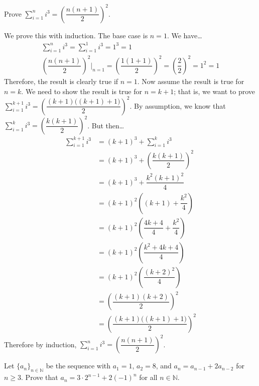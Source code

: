 \documentclass[11pt,letterpaper]{article}
\begin{document}

 Prove $\displaystyle \sum_{i=1}^n i^3= \left( \dfrac{n(n + 1)}{2} \right)^2$. \pspace

\sol We prove this with induction. The base case is $n= 1$. We have\dots
	\[
	\begin{gathered}
	\sum_{i=1}^n i^3= \sum_{i=1}^1 i^3= 1^3= 1 \\[0.3cm]
	\left( \dfrac{n(n + 1)}{2} \right)^2 \bigg|_{n=1}= \left( \dfrac{1(1 + 1)}{2} \right)^2= \left( \dfrac{2}{2} \right)^2= 1^2= 1
	\end{gathered}
	\]
Therefore, the result is clearly true if $n= 1$. Now assume the result is true for $n= k$. We need to show the result is true for $n= k + 1$; that is, we want to prove $\displaystyle \sum_{i=1}^{k+1} i^3= \left( \dfrac{(k + 1) \big( (k + 1) + 1 \big)}{2} \right)^2$. By assumption, we know that $\displaystyle \sum_{i=1}^k i^3= \left( \dfrac{k(k + 1)}{2} \right)^2$. But then\dots
	\[
	\begin{aligned}
	\sum_{i=1}^{k+1} i^3&= (k + 1)^3 + \sum_{i=1}^k i^3 \\
	&= (k + 1)^3 + \left( \dfrac{k(k + 1)}{2} \right)^2 \\
	&= (k + 1)^3 + \dfrac{k^2 (k + 1)^2}{4} \\
	&= (k + 1)^2 \left( (k + 1) + \dfrac{k^2}{4} \right) \\
	&= (k + 1)^2 \left( \dfrac{4k + 4}{4} + \dfrac{k^2}{4} \right) \\
	&= (k + 1)^2 \left( \dfrac{k^2 + 4k + 4}{4} \right) \\
	&= (k + 1)^2 \left( \dfrac{(k + 2)^2}{4} \right) \\
	&= \left( \dfrac{(k + 1)(k + 2)}{2} \right)^2 \\
	&= \left( \dfrac{(k + 1) \big( (k + 1) + 1 \big)}{2} \right)^2 
	\end{aligned}
	\]
Therefore by induction, $\displaystyle \sum_{i=1}^n i^3= \left( \dfrac{n(n + 1)}{2} \right)^2$. 



\newpage



 Let $\{ a_n \}_{n \in \mathbb{N}}$ be the sequence with $a_1= 1$, $a_2= 8$, and $a_n= a_{n-1} + 2a_{n-2}$ for $n \geq 3$. Prove that $a_n= 3 \cdot 2^{n-1} + 2(-1)^n$ for all $n \in \mathbb{N}$. \pspace
\end{document}
